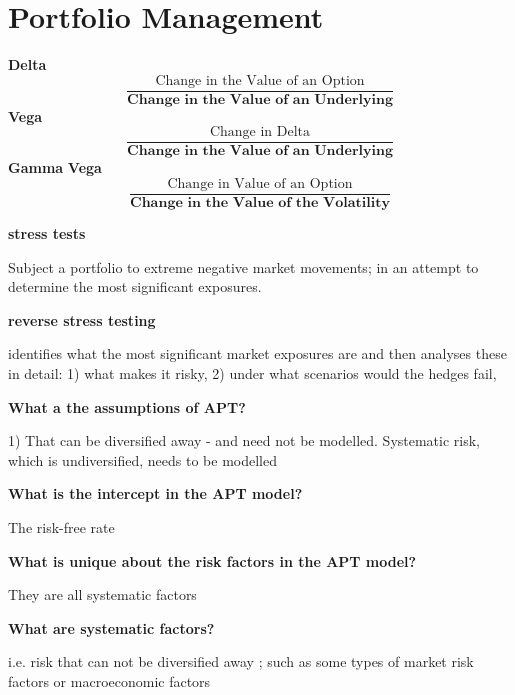 \documentclass[12pt]{article}
\begin{document}
\newpage
\section{Portfolio Management}


\begin{framed}
	
	\textbf{Delta}
	$$
	\dfrac{\text{Change in the Value of an Option}}{\textbf{Change in the Value of an Underlying}}
	$$
	\textbf{Vega}
	$$
	\dfrac{\text{Change in Delta}}{\textbf{Change in the Value of an Underlying}}
	$$
	\textbf{Gamma}
		\textbf{Vega}
	$$
	\dfrac{\text{Change in Value of an Option}}{\textbf{Change in the Value of the Volatility}}
	$$
\end{framed}

\textbf{stress tests}

Subject a portfolio to extreme negative market movements; in an attempt to determine the most significant exposures. 

\textbf{reverse stress testing}

identifies what the most significant market exposures are and then analyses these in detail: 1) what makes it risky, 2) under what scenarios would the hedges fail, 

\textbf{What a the assumptions of APT?}

1) That  can be diversified away - and need not be modelled. Systematic risk, which is undiversified, needs to be modelled

\textbf{What is the intercept in the APT model?}

The risk-free rate

\textbf{What is unique about the risk factors in the APT model?}

They are all systematic factors

\textbf{What are systematic factors?}

i.e. risk that can not be diversified away ; such as some types of market risk factors or macroeconomic factors
\end{document}
